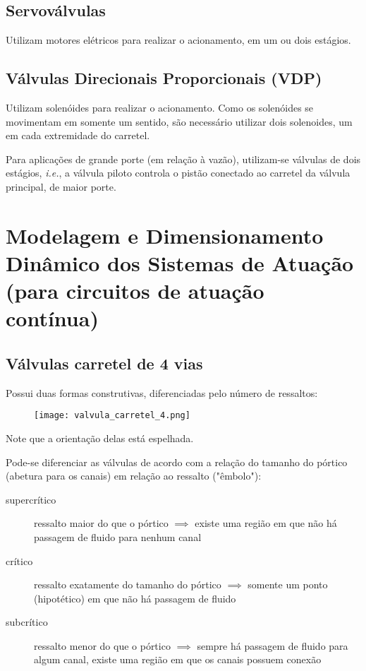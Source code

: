 \documentclass[a4paper]{report}
\begin{document}
\subsection*{Servoválvulas}

Utilizam motores elétricos para realizar o acionamento, em um ou dois estágios.

\subsection*{Válvulas Direcionais Proporcionais (VDP)}

Utilizam solenóides para realizar o acionamento. Como os solenóides se movimentam em somente um sentido, são necessário utilizar dois solenoides, um em cada extremidade do carretel.

Para aplicações de grande porte (em relação à vazão), utilizam-se válvulas de dois estágios, \emph{i.e.}, a válvula piloto controla o pistão conectado ao carretel da válvula principal, de maior porte.


\section*{Modelagem e Dimensionamento Dinâmico dos Sistemas de Atuação (para circuitos de atuação contínua)}

\subsection*{Válvulas carretel de 4 vias}

Possui duas formas construtivas, diferenciadas pelo número de ressaltos:
\begin{figure}[H]
    \centering
    \texttt{[image: valvula\_carretel\_4.png]}
\end{figure}
Note que a orientação delas está espelhada.

Pode-se diferenciar as válvulas de acordo com a relação do tamanho do pórtico (abetura para os canais) em relação ao ressalto ("êmbolo"):
\begin{description}
    \item[supercrítico] ressalto maior do que o pórtico $\implies$ existe uma região em que não há passagem de fluido para nenhum canal
    \item[crítico] ressalto exatamente do tamanho do pórtico $\implies$ somente um ponto (hipotético) em que não há passagem de fluido
    \item[subcrítico] ressalto menor do que o pórtico $\implies$ sempre há passagem de fluido para algum canal, existe uma região em que os canais possuem conexão
\end{description}
\end{document}
